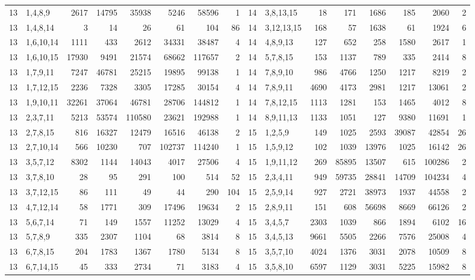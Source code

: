 \begin{table}[tp]
\begin{ruledtabular}
\begin{tabular}{rlrrrrrr@{\hspace{2.2em}}rlrrrrrr}
13 & 1,4,8,9 & 2617 & 14795 & 35938 & 5246 & 58596 & 1 & 14 & 3,8,13,15 & 18 & 171 & 1686 & 185 & 2060 & 2 \\
13 & 1,4,8,14 & 3 & 14 & 26 & 61 & 104 & 86 & 14 & 3,12,13,15 & 168 & 57 & 1638 & 61 & 1924 & 6 \\
13 & 1,6,10,14 & 1111 & 433 & 2612 & 34331 & 38487 & 4 & 14 & 4,8,9,13 & 127 & 652 & 258 & 1580 & 2617 & 1 \\
13 & 1,6,10,15 & 17930 & 9491 & 21574 & 68662 & 117657 & 2 & 14 & 5,7,8,15 & 153 & 1137 & 789 & 335 & 2414 & 8 \\
13 & 1,7,9,11 & 7247 & 46781 & 25215 & 19895 & 99138 & 1 & 14 & 7,8,9,10 & 986 & 4766 & 1250 & 1217 & 8219 & 2 \\
13 & 1,7,12,15 & 2236 & 7328 & 3305 & 17285 & 30154 & 4 & 14 & 7,8,9,11 & 4690 & 4173 & 2981 & 1217 & 13061 & 2 \\
13 & 1,9,10,11 & 32261 & 37064 & 46781 & 28706 & 144812 & 1 & 14 & 7,8,12,15 & 1113 & 1281 & 153 & 1465 & 4012 & 8 \\
13 & 2,3,7,11 & 5213 & 53574 & 110580 & 23621 & 192988 & 1 & 14 & 8,9,11,13 & 1133 & 1051 & 127 & 9380 & 11691 & 1 \\
13 & 2,7,8,15 & 816 & 16327 & 12479 & 16516 & 46138 & 2 & 15 & 1,2,5,9 & 149 & 1025 & 2593 & 39087 & 42854 & 26 \\
13 & 2,7,10,14 & 566 & 10230 & 707 & 102737 & 114240 & 1 & 15 & 1,5,9,12 & 102 & 1039 & 13976 & 1025 & 16142 & 26 \\
13 & 3,5,7,12 & 8302 & 1144 & 14043 & 4017 & 27506 & 4 & 15 & 1,9,11,12 & 269 & 85895 & 13507 & 615 & 100286 & 2 \\
13 & 3,7,8,10 & 28 & 95 & 291 & 100 & 514 & 52 & 15 & 2,3,4,11 & 949 & 59735 & 28841 & 14709 & 104234 & 4 \\
13 & 3,7,12,15 & 86 & 111 & 49 & 44 & 290 & 104 & 15 & 2,5,9,14 & 927 & 2721 & 38973 & 1937 & 44558 & 2 \\
13 & 4,7,12,14 & 58 & 1771 & 309 & 17496 & 19634 & 2 & 15 & 2,8,9,11 & 151 & 608 & 56698 & 8669 & 66126 & 2 \\
13 & 5,6,7,14 & 71 & 149 & 1557 & 11252 & 13029 & 4 & 15 & 3,4,5,7 & 2303 & 1039 & 866 & 1894 & 6102 & 16 \\
13 & 5,7,8,9 & 335 & 2307 & 1104 & 68 & 3814 & 8 & 15 & 3,4,5,13 & 9661 & 5505 & 2266 & 7576 & 25008 & 4 \\
13 & 6,7,8,15 & 204 & 1783 & 1367 & 1780 & 5134 & 8 & 15 & 3,5,7,10 & 4024 & 1376 & 3031 & 2078 & 10509 & 8 \\
13 & 6,7,14,15 & 45 & 333 & 2734 & 71 & 3183 & 4 & 15 & 3,5,8,10 & 6597 & 1129 & 3031 & 5225 & 15982 & 8 \\

\end{tabular}
\end{ruledtabular}
\end{table}
